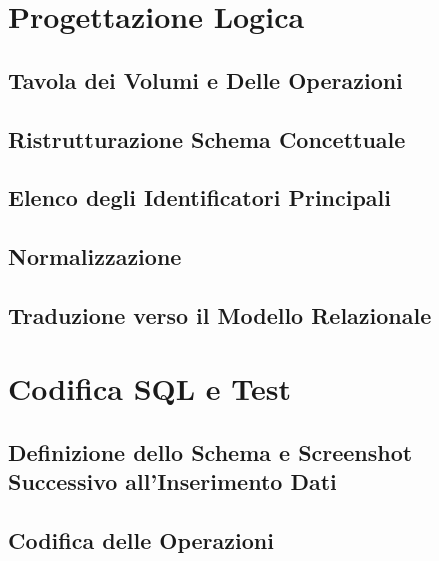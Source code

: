 \documentclass[12pt]{article} %
\begin{document}

	\section{Progettazione Logica}

		\subsection{Tavola dei Volumi e Delle Operazioni}

		
		\subsection{Ristrutturazione Schema Concettuale}

		
    \newpage
		\subsection{Elenco degli Identificatori Principali}

		
    \newpage
		\subsection{Normalizzazione}

		
		\subsection{Traduzione verso il Modello Relazionale}

		


	\section{Codifica SQL e Test}

		\subsection{Definizione dello Schema e Screenshot Successivo all'Inserimento Dati}
		

%
		\subsection{Codifica delle Operazioni}

		
%
%
\end{document}
